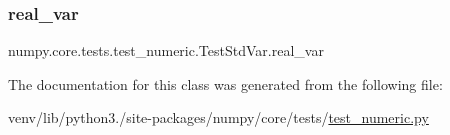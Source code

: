 \subsubsection{\texorpdfstring{real\+\_\+var}{real\_var}}
{\footnotesize\ttfamily numpy.\+core.\+tests.\+test\+\_\+numeric.\+Test\+Std\+Var.\+real\+\_\+var}



The documentation for this class was generated from the following file\+:\begin{DoxyCompactItemize}
\item 
venv/lib/python3./site-\/packages/numpy/core/tests/\hyperlink{core_2tests_2test__numeric_8py}{test\+\_\+numeric.\+py}\end{DoxyCompactItemize}
